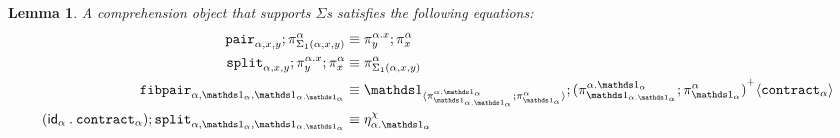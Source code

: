 \documentclass[10pt]{article}
\newtheorem{lemma}{Lemma}
\theoremstyle{definition}
\newcommand{\id}{\mathsf{id}}
\newcommand\bdot[0]{\mathbin{.}}
\newcommand\ApPlus[2]{\ensuremath{{#1}^+ \langle #2 \rangle }}
\begin{document}
\begin{lemma}
A comprehension object that supports $\Sigma$s satisfies the following equations:
\begin{align}
\pair{\alpha,x,y};\pi^\alpha_{\Sigma_1(\alpha, x, y)} &\equiv \pi^{\alpha.x}_y;\pi^\alpha_x \\
\tsplit{\alpha,x,y};\pi^{\alpha.x}_y;\pi^\alpha_x &\equiv \pi^\alpha_{\Sigma_1(\alpha, x, y)} \\
\fibpair{\alpha,\One_\alpha,\One_{\alpha.\One_\alpha}} &\equiv \ApOne{\pi^{\alpha.\One_\alpha}_{\One_{\alpha.\One_\alpha}};\pi^\alpha_{\One_\alpha}};\ApPlus{(\pi^{\alpha.\One_\alpha}_{\One_{\alpha.\One_\alpha}};\pi^\alpha_{\One_\alpha})}{\contract{\alpha}} \\
(\id_\alpha \bdot \contract{\alpha});\tsplit{\alpha,\One_\alpha,\One_{\alpha.\One_\alpha}} &\equiv \eta^\chi_{\alpha.\One_\alpha}
\end{align}
\end{lemma}
\end{document}
